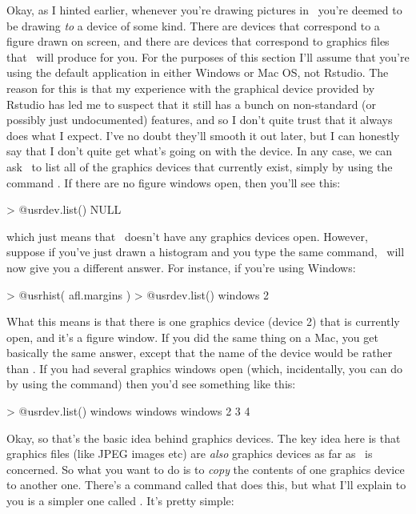 Okay, as I hinted earlier, whenever you're drawing pictures in \R\ you're deemed to be drawing {\it to} a device of some kind.  There are devices that correspond to a figure drawn on screen, and there are devices that correspond to graphics files that \R\ will produce for you. For the purposes of this section I'll assume that you're using the default application in either Windows or Mac OS, not Rstudio. The reason for this is that my experience with the graphical device provided by Rstudio has led me to suspect that it still has a bunch on non-standard (or possibly just undocumented) features, and so I don't quite trust that it always does what I expect. I've no doubt they'll smooth it out later, but I can honestly say that I don't quite get what's going on with the  device.  In any case, we can ask \R\ to list all of the graphics devices that currently exist, simply by using the command . If there are no figure windows open, then you'll see this:
\begin{rblock1}
> @usr{dev.list()}
NULL
\end{rblock1}
which just means that \R\ doesn't have any graphics devices open. However, suppose if you've just drawn a histogram and you type the same command, \R\ will now give you a different answer. For instance, if you're using Windows:
\begin{rblock1}
> @usr{hist( afl.margins )}
> @usr{dev.list()}
windows 
      2
\end{rblock1}
What this means is that there is one graphics device (device 2) that is currently open, and it's a figure window. If you did the same thing on a Mac, you get basically the same answer, except that the name of the device would be  rather than . If you had several graphics windows open (which, incidentally, you can do by using the  command) then you'd see something like this:
\begin{rblock1}
> @usr{dev.list()}
windows windows windows  
      2       3       4 
\end{rblock1}
Okay, so that's the basic idea behind graphics devices. The key idea here is that graphics files (like JPEG images etc) are {\it also} graphics devices as far as \R\ is concerned. So what you want to do is to {\it copy} the contents of one graphics device to another one. There's a command called  that does this, but what I'll explain to you is a simpler one called . It's pretty simple:

